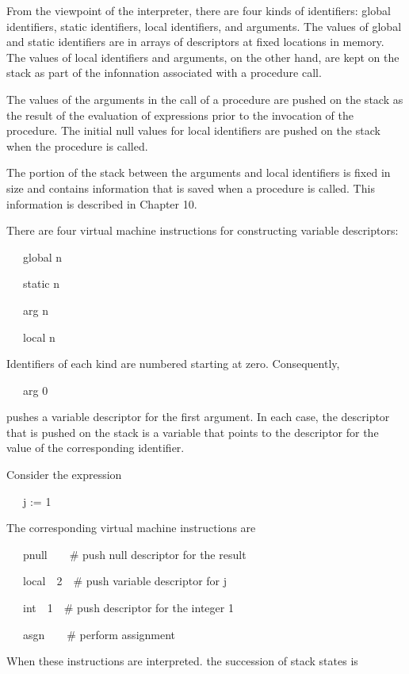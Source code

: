 From the viewpoint of the interpreter, there are four kinds of
identifiers: global identifiers, static identifiers, local
identifiers, and arguments. The values of global and static
identifiers are in arrays of descriptors at fixed locations in
memory. The values of local identifiers and arguments, on the other
hand, are kept on the stack as part of the infonnation associated with
a procedure call.

The values of the arguments in the call of a procedure are pushed on
the stack as the result of the evaluation of expressions prior to the
invocation of the procedure. The initial null values for local
identifiers are pushed on the stack when the procedure is called.

The portion of the stack between the arguments and local identifiers
is fixed in size and contains information that is saved when a
procedure is called. This information is described in Chapter 10.

There are four virtual machine instructions for constructing variable
descriptors:


\ \ \ global n

\ \ \ static n

\ \ \ arg n

\ \ \ local n


Identifiers of each kind are numbered starting at zero. Consequently,

{\ttfamily\mdseries
\ \ \ arg 0}

\noindent pushes a variable descriptor for the first argument. In each
case, the descriptor that is pushed on the stack is a variable that
points to the descriptor for the value of the corresponding identifier.

Consider the expression

{\ttfamily\mdseries
\ \ \ j := 1}

The corresponding virtual machine instructions are

{\ttfamily\mdseries
\ \ \ pnull\ \ \ \ \# push null descriptor for the result}

{\ttfamily\mdseries
\ \ \ local\ \ 2\ \ \# push variable descriptor for j}

{\ttfamily\mdseries
\ \ \ int\ \ 1\ \ \# push descriptor for the integer 1}

{\ttfamily\mdseries
\ \ \ asgn\ \ \ \ \# perform assignment}


When these instructions are interpreted. the succession of stack states is


